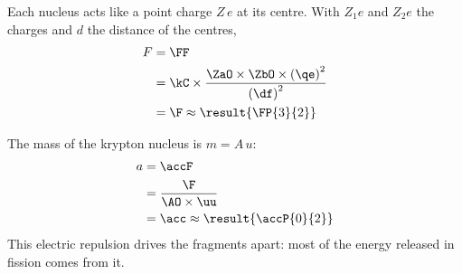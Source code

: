 \begin{abcliste}
\abc Each nucleus acts like a point charge $Z\,e$ at its centre. With $Z_1 e$ and $Z_2 e$ the charges and $d$ the distance of the centres,
\begin{align}
 F &= \FF \\
   &= \kC\times\frac{\ZaO\times\ZbO\times\left(\qe\right)^2}{\left(\df\right)^2} \\
   &= \F \approx \result{\FP{3}{2}}
\end{align}

\abc The mass of the krypton nucleus is $m = A\,u$:
\begin{align}
 a &= \accF \\
   &= \frac{\F}{\AO\times\uu} \\
   &= \acc \approx \result{\accP{0}{2}}
\end{align}
This electric repulsion drives the fragments apart: most of the energy released in fission comes from it.
\end{abcliste}
